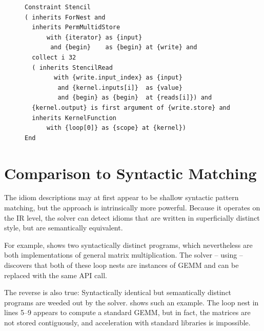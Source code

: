 \begin{figure}[t]
\begin{lstlisting}[language=IDL, label={fig:stencilcompute}, caption=
   {IDL specification of a basic stencil computation}]
Constraint Stencil
( inherits ForNest and
  inherits PermMultidStore
      with {iterator} as {input}
       and {begin}    as {begin} at {write} and
  collect i 32
  ( inherits StencilRead
        with {write.input_index} as {input}
         and {kernel.inputs[i]}  as {value}
         and {begin} as {begin}  at {reads[i]}) and
  {kernel.output} is first argument of {write.store} and
  inherits KernelFunction
      with {loop[0]} as {scope} at {kernel})
End
\end{lstlisting}
\end{figure}

\section{Comparison to Syntactic Matching}
\label{sec:syntacticmatching}

    The idiom descriptions may at first appear to be shallow syntactic pattern
    matching, but the approach is intrinsically more powerful.
    Because it operates on the IR level, the solver can detect idioms that are
    written in superficially distinct style, but are semantically equivalent.

    For example,  shows two syntactically distinct
    programs, which nevertheless are both implementations of general matrix
    multiplication.
    The solver -- using  -- discovers that both of these
    loop nests are instances of GEMM and can be replaced with the same API call.

    The reverse is also true:
    Syntactically identical but semantically distinct programs are weeded out by
    the solver.
     shows such an example.
    The loop nest in lines 5--9 appears to compute a standard GEMM, but in fact,
    the matrices are not stored contiguously, and acceleration with standard
    libraries is impossible.

